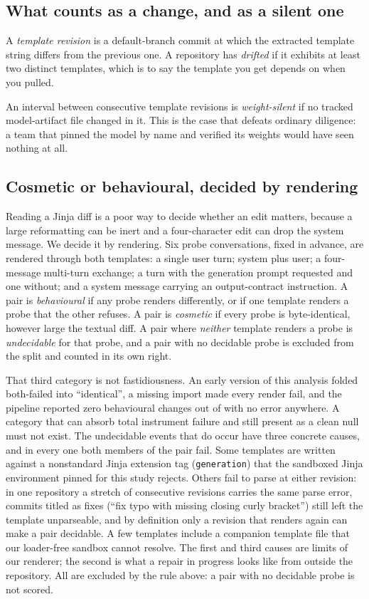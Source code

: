 \subsection{What counts as a change, and as a silent one}

A \emph{template revision} is a default-branch commit at which the extracted template string differs
from the previous one. A repository has \emph{drifted} if it exhibits at least two distinct
templates, which is to say the template you get depends on when you pulled.

An interval between consecutive template revisions is \emph{weight-silent} if no tracked
model-artifact file changed in it. This is the case that defeats ordinary diligence: a team that
pinned the model by name and verified its weights would have seen nothing at all.

\subsection{Cosmetic or behavioural, decided by rendering}

Reading a Jinja diff is a poor way to decide whether an edit matters, because a large reformatting
can be inert and a four-character edit can drop the system message. We decide it by rendering. Six
probe conversations, fixed in advance, are rendered through both templates: a single user turn;
system plus user; a four-message multi-turn exchange; a turn with the generation prompt requested
and one without; and a system message carrying an output-contract instruction. A pair is
\emph{behavioural} if any probe renders differently, or if one template renders a probe that the
other refuses. A pair is \emph{cosmetic} if every probe is byte-identical, however large the textual
diff. A pair where \emph{neither} template renders a probe is \emph{undecidable} for that probe, and
a pair with no decidable probe is excluded from the split and counted in its own right.

That third category is not fastidiousness. An early version of this analysis folded both-failed into
``identical'', a missing import made every render fail, and the pipeline reported zero behavioural
changes out of \NEvents{} with no error anywhere. A category that can absorb total instrument
failure and still present as a clean null must not exist. The \NEventsUndecidable{} undecidable
events that do occur have three concrete causes, and in every one both members of the pair fail.
Some templates are written against a nonstandard Jinja extension tag (\texttt{generation}) that
the sandboxed Jinja environment pinned for this study rejects. Others fail to parse at either revision: in one repository
a stretch of consecutive revisions carries the same parse error, commits titled as fixes
(``fix typo with missing closing curly bracket'') still left the template unparseable, and by
definition only a revision that renders again can make a pair decidable. A few templates include a
companion template file that our loader-free sandbox cannot resolve. The first and third causes
are limits of our renderer; the second is what a repair in progress looks like from outside the
repository. All \NEventsUndecidable{} are excluded by the rule above: a pair with no decidable
probe is not scored.

